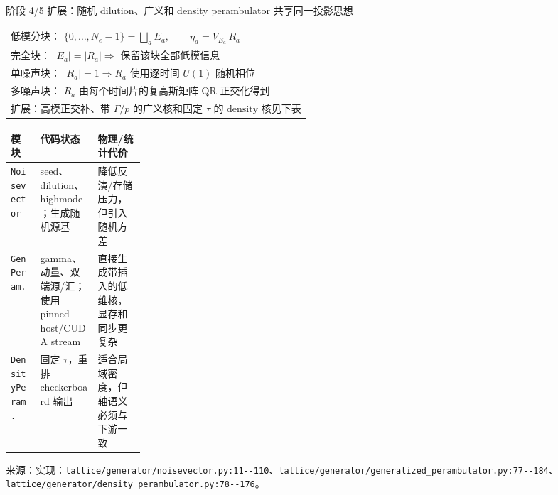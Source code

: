 \documentclass[UTF8,aspectratio=169,11pt]{ctexbeamer}
\newcommand{\source}[1]{%
  \vspace{0.06em}\par{\raggedright\scriptsize\color{muted}来源：#1\par}}
\newcommand{\codepath}[1]{\nolinkurl{#1}}
\begin{document}
\begin{frame}[t]{阶段 4/5 扩展：随机 dilution、广义和 density perambulator 共享同一投影思想}
  \centering
  \begin{tabular}{@{}l@{}}
    $\text{低模分块： }\{0,\ldots,N_e-1\}=\bigsqcup_a E_a,
      \qquad \eta_a=V_{E_a}\,R_a$ \\
    $\text{完全块： }|E_a|=|R_a|\Rightarrow\text{ 保留该块全部低模信息}$ \\
    $\text{单噪声块： }|R_a|=1\Rightarrow R_a\text{ 使用逐时间 }U(1)\text{ 随机相位}$ \\
    $\text{多噪声块： }R_a\text{ 由每个时间片的复高斯矩阵 QR 正交化得到}$ \\
    $\text{扩展：高模正交补、带 }\Gamma/p\text{ 的广义核和固定 }\tau\text{ 的 density 核见下表}$ \\
  \end{tabular}
  \vspace{0.12cm}
  \begin{tabularx}{0.96\linewidth}{@{}L{0.22\linewidth}Y Y@{}}
    \toprule
    模块 & 代码状态 & 物理/统计代价 \\
    \midrule
    \texttt{Noisevector} & seed、dilution、highmode；生成随机源基 & 降低反演/存储压力，但引入随机方差 \\
    \texttt{GenPeram.} & gamma、动量、双端源/汇；使用 pinned host/CUDA stream & 直接生成带插入的低维核，显存和同步更复杂 \\
    \texttt{DensityPeram.} & 固定 $\tau$，重排 checkerboard 输出 & 适合局域密度，但轴语义必须与下游一致 \\
    \bottomrule
  \end{tabularx}
  \source{实现：\codepath{lattice/generator/noisevector.py:11--110}、\codepath{lattice/generator/generalized_perambulator.py:77--184}、\codepath{lattice/generator/density_perambulator.py:78--176}。}
\end{frame}
\end{document}
